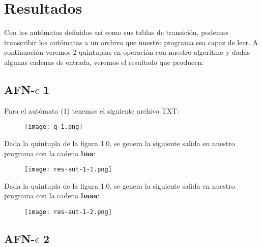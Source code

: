 \section{Resultados}

Con los autómatas definidos así como sus tablas de transición, podemos transcribir los autómatas a un archivo que nuestro programa sea capaz de leer. A continuación veremos 2 quintuplas en operación con nuestro algoritmo y dadas algunas cadenas de entrada, veremos el resultado que producen:

\subsection{AFN-$\epsilon$ 1}

Para el autómata (1) tenemos el siguiente archivo TXT:

\begin{figure}[H]
\texttt{[image: q-1.png]}
\centering \linebreak {}
\end{figure} 

Dada la quintupla de la figura 1.0, se genera la siguiente salida en nuestro programa con la cadena \textbf{baa}:

\begin{figure}[H]
\texttt{[image: res-aut-1-1.png]}
\centering \linebreak {}
\end{figure} 

Dada la quintupla de la figura 1.0, se genera la siguiente salida en nuestro programa con la cadena \textbf{baaa}:

\begin{figure}[H]
\texttt{[image: res-aut-1-2.png]}
\centering \linebreak {}
\end{figure}

\subsection{AFN-$\epsilon$ 2}

